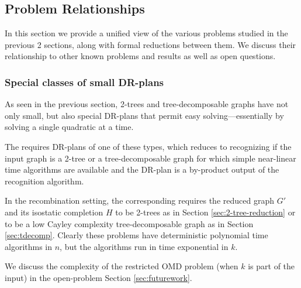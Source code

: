 \subsection{Problem Relationships}
\label{sec:table}

In this section we provide a unified view of the various problems studied in the previous 2 sections, along with formal reductions between them. We discuss their relationship to other known problems and results as well as open questions.





\subsubsection{Special classes of small DR-plans}
As seen in the previous section, 2-trees and tree-decomposable graphs have not only small, but also special DR-plans that permit easy solving---essentially by solving a single quadratic at a time.

The  requires DR-plans of one of these types, which reduces to recognizing if the input graph is a 2-tree or a tree-decomposable graph for which simple near-linear time algorithms are available \cite{valdes1979recognition,fudos1997graph} and the DR-plan is a by-product output of the recognition algorithm.

In the recombination setting, the corresponding  requires the reduced graph $G'$ and its isostatic completion $H$ to be 2-trees as in Section \ref{sec:2-tree-reduction} or to be a low Cayley complexity tree-decomposable graph as in Section \ref{sec:tdecomp}. Clearly these problems have deterministic polynomial time algorithms in $n$, but the algorithms run in time exponential in $k$.

We discuss the complexity of the restricted OMD problem (when $k$ is part of the input) in the open-problem Section \ref{sec:futurework}.

